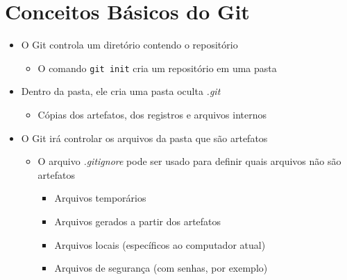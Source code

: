 \documentclass{beamer}
\newenvironment{slide}{\begin{frame}{\insertsection}}{\end{frame}}
\begin{document}
\section{Conceitos Básicos do Git}
\begin{slide}
    \begin{itemize}
        \item O Git controla um diretório contendo o repositório
        \begin{itemize}
            \pause
            \item O comando \texttt{git init} cria um repositório em uma pasta
        \end{itemize}
        \pause
        \item Dentro da pasta, ele cria uma pasta oculta \emph{.git}
        \begin{itemize}
            \pause
            \item Cópias dos artefatos, dos registros e arquivos internos
        \end{itemize}
        \pause
        \item O Git irá controlar os arquivos da pasta que são artefatos
        \begin{itemize}
            \pause
            \item O arquivo \emph{.gitignore} pode ser usado para definir quais
                arquivos não são artefatos
            \begin{itemize}
                \pause
                \item Arquivos temporários
                \pause
                \item Arquivos gerados a partir dos artefatos
                \pause
                \item Arquivos locais (específicos ao computador atual)
                \pause
                \item Arquivos de segurança (com senhas, por exemplo)
            \end{itemize}
        \end{itemize}
    \end{itemize}
\end{slide}
\end{document}
